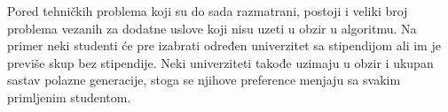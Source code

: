 \documentclass[a4paper]{article}
\begin{document}
Pored tehničkih problema koji su do sada razmatrani, postoji i veliki broj problema vezanih za dodatne uslove koji nisu uzeti u obzir u algoritmu. Na primer neki studenti će pre izabrati određen univerzitet sa stipendijom ali im je previše skup bez stipendije. Neki univerziteti takođe uzimaju u obzir i ukupan sastav polazne generacije, stoga se njihove preference menjaju sa svakim primljenim studentom.

\appendix
 

\end{document}
